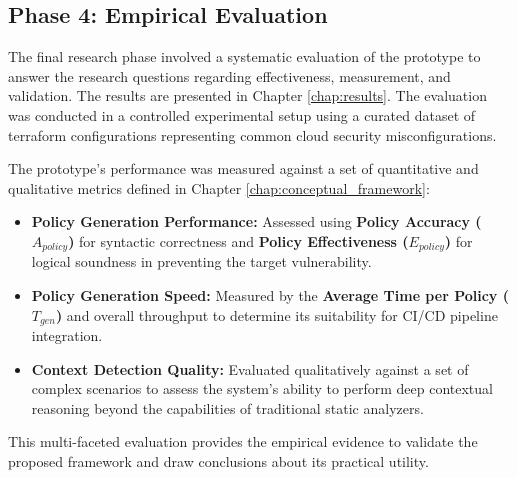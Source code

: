 \subsection{Phase 4: Empirical Evaluation}
The final research phase involved a systematic evaluation of the prototype to answer the research questions regarding effectiveness, measurement, and validation. The results are presented in Chapter \ref{chap:results}. The evaluation was conducted in a controlled experimental setup using a curated dataset of \gls{terraform} configurations representing common cloud security misconfigurations.

The prototype's performance was measured against a set of quantitative and qualitative metrics defined in Chapter \ref{chap:conceptual_framework}:
\begin{itemize}
    \item \textbf{Policy Generation Performance:} Assessed using \textbf{Policy Accuracy ($A_{policy}$)} for syntactic correctness and \textbf{Policy Effectiveness ($E_{policy}$)} for logical soundness in preventing the target vulnerability.
    \item \textbf{Policy Generation Speed:} Measured by the \textbf{Average Time per Policy ($T_{gen}$)} and overall throughput to determine its suitability for CI/CD pipeline integration.
    \item \textbf{Context Detection Quality:} Evaluated qualitatively against a set of complex scenarios to assess the system's ability to perform deep contextual reasoning beyond the capabilities of traditional static analyzers.
\end{itemize}

This multi-faceted evaluation provides the empirical evidence to validate the proposed framework and draw conclusions about its practical utility.